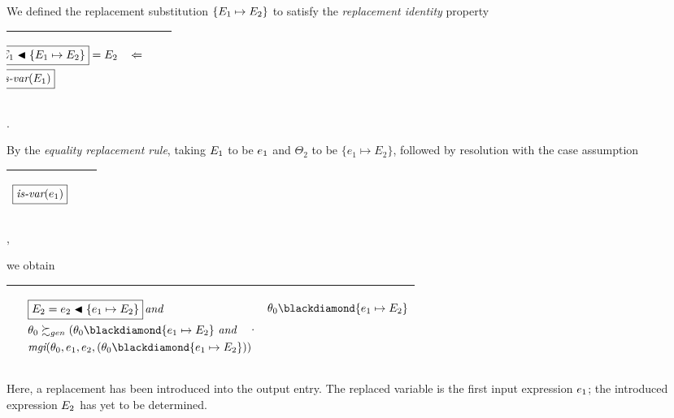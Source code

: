 \documentclass[runningheads]{llncs}
\DeclareMathOperator{\uand}{\emph{and}\,}
\DeclareMathOperator{\uimpliedby}{\Leftarrow}
\DeclareMathOperator{\isvar}{\emph{is-var}}
\DeclareMathOperator{\mgi}{\emph{mgi}}
\begin{document}
We  defined the replacement substitution $\{E_{1} \mapsto E_{2}\}$ to satisfy the \emph{replacement identity} property 
\begin{center}
  \begin{tabular}{|m{}|m{}||m{}|}
\hline
\begin{center}
$
\begin{aligned}
\hspace{-.5cm}
{\begin{aligned}
&\boxed{\E{1} \apply \{\E{1} \mapsto \E{2} \}} = \E{2} \quad \uimpliedby \\ &\boxed{\isvar(\E{1}) }
\end{aligned}}
\end{aligned}
$
\end{center}& &  \\  \hline
\end{tabular}.
\end{center}
By the \emph{equality replacement rule}, taking $E_{1}$ to be $e_{1}$ and $\Theta_2$ to be $\{e_1 \mapsto E_2\}$, followed by resolution with the case assumption
\begin{center}
  \begin{tabular}{|m{}|m{}||m{}|}
\hline
\begin{center}
$
\boxed{\isvar(\e{1})} 
$
\end{center}& &  \\  \hline
\end{tabular},
\end{center}
we obtain
\begin{center}
\begin{tabular}{|m{}|m{}||m{}|}
 \hline 
  &\begin{center} 
$
\begin{aligned}
&\begin{aligned}&\boxed{\E{2} = \e{2} \apply \{\e{1} \mapsto  \E{2}\}} \uand \end{aligned}   \\
 \,\, & \thet{0} \moregen (\thet{0} \compose \{\e{1} \mapsto  \E{2}\} \, \uand
\\
  \,\, & {\mgi}(\thet{0}, \e{1}, \e{2}, (\thet{0} \compose \{\e{1} \mapsto  \E{2}\}))
\end{aligned}.$
\end{center}
& 
\begin{center}$\thet{0} \compose \{\e{1} \mapsto  \E{2}\}$ \end{center}\\
\hline
\end{tabular}
\end{center}
Here, a replacement has been introduced into the output entry.  
The replaced variable is the first input expression $e_{1}$; the introduced expression $E_{2}$ has yet to be determined.
\end{document}
